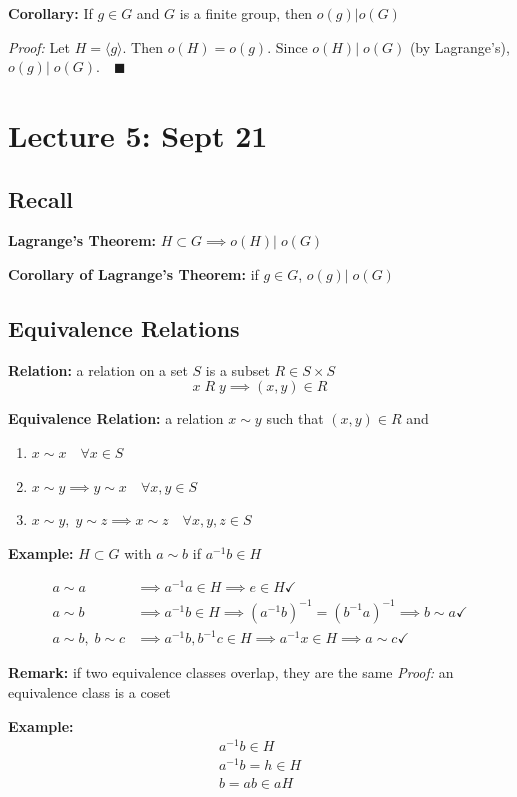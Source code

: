 \documentclass[12pt]{report}
\newcommand{\qed}{\quad \blacksquare}
\newcommand{\brak}[1]{\langle #1 \rangle}
\begin{document}
\textbf{Corollary:} If $g \in G$ and $G$ is a finite group, then $o(g) | o(G)$

\emph{Proof:} Let $H = \brak{g}$. Then $o(H) = o(g)$. Since $o(H) |\; o(G)$ (by Lagrange's), $o(g) |\; o(G). \qed$

\section*{Lecture 5: Sept 21}
\subsection*{Recall}
\textbf{Lagrange's Theorem:} $H \subset G \implies o(H) |\; o(G)$

\textbf{Corollary of Lagrange's Theorem:} if $g \in G$, $o(g) |\; o(G)$

\subsection*{Equivalence Relations}
\textbf{Relation:} a relation on a set $S$ is a subset $R \in S \times S$
\[x \; R \; y \implies (x, y) \in R\]

\textbf{Equivalence Relation:} a relation $x \sim y$ such that $(x, y) \in R$ and 
\begin{enumerate}
    \item $x \sim x \quad \forall x \in S$
    \item $x \sim y \implies y \sim x \quad \forall x, y \in S$
    \item $x \sim y, \; y \sim z \implies x \sim z \quad \forall x, y, z \in S$
\end{enumerate}

\textbf{Example:} $H \subset G$ with $a \sim  b$ if $a^{-1} b \in H$ 

\begin{align}
    a \sim a &\implies a^{-1}a \in H \implies e \in H \checkmark\\
    a \sim b &\implies a^{-1}b \in H \implies (a^{-1}b)^{-1} = (b^{-1}a)^{-1} \implies b \sim a \checkmark\\
    a\sim b, \; b \sim c &\implies a^{-1}b, b^{-1}c \in H \implies a^{-1}x \in H \implies a \sim c \checkmark
\end{align}

\textbf{Remark:} if two equivalence classes overlap, they are the same 
\emph{Proof:} an equivalence class is a coset 

\textbf{Example:}
\begin{align*}
    a^{-1}b \in H\\
    a^{-1}b = h \in H\\
    b = ab \in aH
\end{align*}
\end{document}
